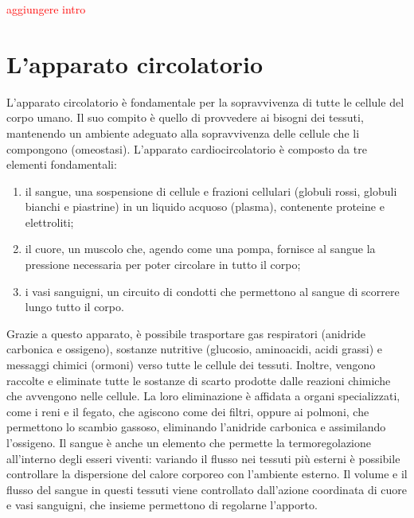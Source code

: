 \textcolor{red}{aggiungere intro}
\section{L'apparato circolatorio}
L'apparato circolatorio è fondamentale per la sopravvivenza di tutte le cellule del corpo umano. Il suo compito è quello di provvedere ai bisogni dei tessuti, mantenendo un ambiente adeguato alla sopravvivenza delle cellule che li compongono (omeostasi)\cite{Cevese2002}. 
L'apparato cardiocircolatorio è composto da tre elementi fondamentali:
\begin{enumerate}
\item il sangue, una sospensione di cellule e frazioni cellulari (globuli rossi, globuli bianchi e piastrine) in un liquido acquoso (plasma), contenente proteine e elettroliti;
\item il cuore, un muscolo che, agendo come una pompa, fornisce al sangue la pressione necessaria per poter circolare in tutto il corpo;
\item i vasi sanguigni, un circuito di condotti che permettono al sangue di scorrere lungo tutto il corpo.
\end{enumerate}
Grazie a questo apparato, è possibile trasportare gas respiratori (anidride carbonica e ossigeno), sostanze nutritive (glucosio, aminoacidi, acidi grassi) e messaggi chimici (ormoni) verso tutte le cellule dei tessuti. Inoltre, vengono raccolte e eliminate tutte le sostanze di scarto prodotte  dalle reazioni chimiche che avvengono nelle cellule. La loro eliminazione è affidata a organi specializzati, come i reni e il fegato, che agiscono come dei filtri, oppure ai polmoni, che permettono lo scambio gassoso, eliminando l'anidride carbonica e assimilando l'ossigeno. Il sangue è anche un elemento che permette la termoregolazione all'interno degli esseri viventi: variando il flusso nei tessuti più esterni è possibile controllare la dispersione del calore corporeo con l'ambiente esterno. Il volume e il flusso del sangue in questi tessuti viene controllato dall'azione coordinata di cuore e vasi sanguigni, che insieme permettono di regolarne l'apporto.

